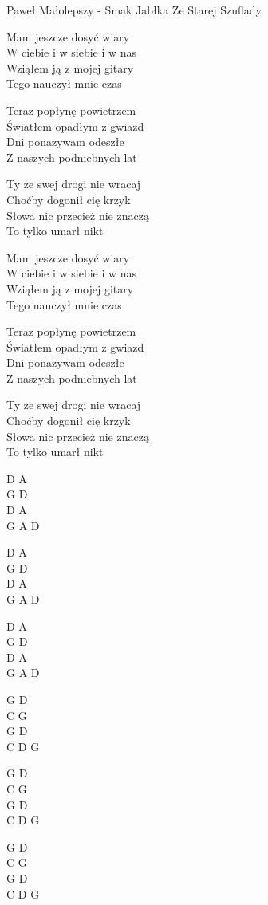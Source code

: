 {Paweł Małolepszy - Smak Jabłka}
{Ze Starej Szuflady}
\begin{text}
Mam jeszcze dosyć wiary\\ 
W ciebie i w siebie i w nas\\
Wziąłem ją z mojej gitary\\
Tego nauczył mnie czas

Teraz popłynę powietrzem\\
Światłem opadłym z gwiazd\\
Dni ponazywam odeszłe\\
Z naszych podniebnych lat

Ty ze swej drogi nie wracaj\\
Choćby dogonił cię krzyk\\
Słowa nic przecież nie znaczą\\
To tylko umarł nikt

Mam jeszcze dosyć wiary\\
W ciebie i w siebie i w nas\\
Wziąłem ją z mojej gitary\\
Tego nauczył mnie czas

Teraz popłynę powietrzem\\
Światłem opadłym z gwiazd\\
Dni ponazywam odeszłe\\
Z naszych podniebnych lat

Ty ze swej drogi nie wracaj\\
Choćby dogonił cię krzyk\\
Słowa nic przecież nie znaczą\\
To tylko umarł nikt
\end{text}
\begin{chord}
D A\\
G D\\
D A\\
G A D

D A\\
G D\\
D A\\
G A D

D A\\
G D\\
D A\\
G A D

G D\\
C G\\
G D\\
C D G

G D\\
C G\\
G D\\
C D G

G D\\
C G\\
G D\\
C D G
\end{chord}